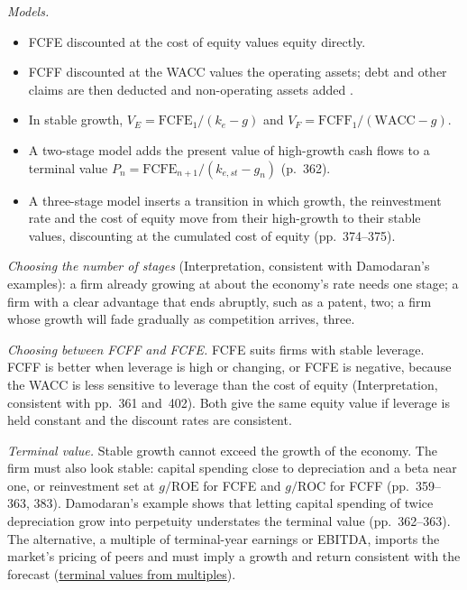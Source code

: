 \begin{qfmethod}\label{meth:fcf-valuation-models}
 \emph{Models.}
\begin{itemize}
\item FCFE discounted at the cost of equity values equity directly.
\item FCFF discounted at the WACC values the operating assets; debt and other claims are then deducted and non-operating assets added \citep[pp.~358--362, 383]{investment-valuation-2012}.
\item In stable growth, $V_E=\mathrm{FCFE}_1/(k_e-g)$ and $V_F=\mathrm{FCFF}_1/(\mathrm{WACC}-g)$.
\item A two-stage model adds the present value of high-growth cash flows to a terminal value $P_n=\mathrm{FCFE}_{n+1}/(k_{e,st}-g_n)$ (p.~362).
\item A three-stage model inserts a transition in which growth, the reinvestment rate and the cost of equity move from their high-growth to their stable values, discounting at the cumulated cost of equity (pp.~374--375).
\end{itemize}

\emph{Choosing the number of stages} (Interpretation, consistent with Damodaran's examples): a firm already growing at about the economy's rate needs one stage; a firm with a clear advantage that ends abruptly, such as a patent, two; a firm whose growth will fade gradually as competition arrives, three.

\emph{Choosing between FCFF and FCFE.} FCFE suits firms with stable leverage. FCFF is better when leverage is high or changing, or FCFE is negative, because the WACC is less sensitive to leverage than the cost of equity (Interpretation, consistent with pp.~361 and~402). Both give the same equity value if leverage is held constant and the discount rates are consistent.

\emph{Terminal value.} Stable growth cannot exceed the growth of the economy. The firm must also look stable: capital spending close to depreciation and a beta near one, or reinvestment set at $g/\mathrm{ROE}$ for FCFE and $g/\mathrm{ROC}$ for FCFF (pp.~359--363, 383). Damodaran's example shows that letting capital spending of twice depreciation grow into perpetuity understates the terminal value (pp.~362--363). The alternative, a multiple of terminal-year earnings or EBITDA, imports the market's pricing of peers and must imply a growth and return consistent with the forecast (\hyperref[meth:comparables-evaluation]{terminal values from multiples}).


\end{qfmethod}
